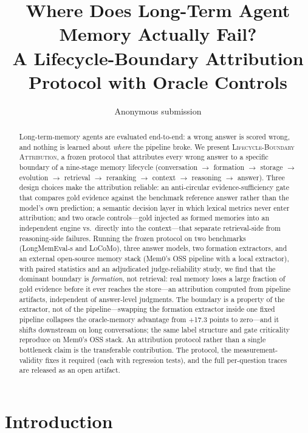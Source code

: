 \documentclass[11pt]{article}
\title{Where Does Long-Term Agent Memory Actually Fail?\\
A Lifecycle-Boundary Attribution Protocol with Oracle Controls}
\author{Anonymous submission}
\newcommand{\protocol}{\textsc{Lifecycle-Boundary Attribution}}
\begin{document}
\maketitle

\begin{abstract}
Long-term-memory agents are evaluated end-to-end: a wrong answer is scored
wrong, and nothing is learned about \emph{where} the pipeline broke. We
present \protocol{}, a frozen protocol that attributes every wrong answer
to a specific boundary of a nine-stage memory lifecycle (conversation
$\rightarrow$ formation $\rightarrow$ storage $\rightarrow$ evolution
$\rightarrow$ retrieval $\rightarrow$ reranking $\rightarrow$ context
$\rightarrow$ reasoning $\rightarrow$ answer). Three design choices make
the attribution reliable: an anti-circular evidence-sufficiency gate that
compares gold evidence against the benchmark reference answer rather than
the model's own prediction; a semantic decision layer in which lexical
metrics never enter attribution; and two oracle controls---gold injected
as formed memories into an independent engine vs.\ directly into the
context---that separate retrieval-side from reasoning-side failures.
Running the frozen protocol on two benchmarks (LongMemEval-s and LoCoMo),
three answer models, two formation extractors, and an external
open-source memory stack (Mem0's OSS pipeline with a local extractor),
with paired statistics and an adjudicated
judge-reliability study, we find that the dominant boundary is
\emph{formation}, not retrieval: real memory loses a large fraction of
gold evidence before it ever reaches the store---an attribution
computed from pipeline artifacts, independent of answer-level
judgments. The boundary is a
property of the extractor, not of the pipeline---swapping the formation
extractor inside one fixed pipeline collapses the oracle-memory advantage
from +17.3 points to zero---and it shifts downstream on long
conversations; the same label structure and gate criticality reproduce on
Mem0's OSS stack. An attribution protocol rather than a single bottleneck claim is
the transferable contribution. The protocol, the measurement-validity
fixes it required (each with regression tests), and the full
per-question traces are released as an open artifact.
\end{abstract}

\section{Introduction}
\end{document}
